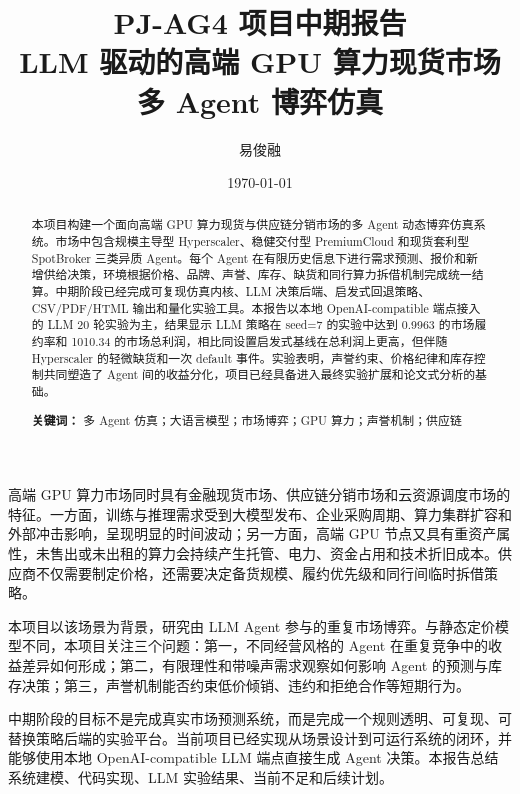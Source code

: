 \documentclass[11pt, a4paper]{article}
\title{\textbf{PJ-AG4 项目中期报告}\\[0.35em]
{\large LLM 驱动的高端 GPU 算力现货市场多 Agent 博弈仿真}}
\author{易俊融}
\date{\today}
\makeatletter
\renewcommand\section{\@startsection{section}{1}{\z@}{-1.2em \@plus -0.3em}{0.5em}{\normalfont\Large\bfseries}}
\makeatother
\begin{document}
\maketitle
\vspace{-1em}

\begin{abstract}
\noindent
本项目构建一个面向高端 GPU 算力现货与供应链分销市场的多 Agent 动态博弈仿真系统。市场中包含规模主导型 Hyperscaler、稳健交付型 PremiumCloud 和现货套利型 SpotBroker 三类异质 Agent。每个 Agent 在有限历史信息下进行需求预测、报价和新增供给决策，环境根据价格、品牌、声誉、库存、缺货和同行算力拆借机制完成统一结算。中期阶段已经完成可复现仿真内核、LLM 决策后端、启发式回退策略、CSV/PDF/HTML 输出和量化实验工具。本报告以本地 OpenAI-compatible 端点接入的 LLM 20 轮实验为主，结果显示 LLM 策略在 seed=7 的实验中达到 0.9963 的市场履约率和 1010.34 的市场总利润，相比同设置启发式基线在总利润上更高，但伴随 Hyperscaler 的轻微缺货和一次 default 事件。实验表明，声誉约束、价格纪律和库存控制共同塑造了 Agent 间的收益分化，项目已经具备进入最终实验扩展和论文式分析的基础。

\vspace{0.4em}
\noindent\textbf{关键词：} 多 Agent 仿真；大语言模型；市场博弈；GPU 算力；声誉机制；供应链
\end{abstract}

\section{引言}

高端 GPU 算力市场同时具有金融现货市场、供应链分销市场和云资源调度市场的特征。一方面，训练与推理需求受到大模型发布、企业采购周期、算力集群扩容和外部冲击影响，呈现明显的时间波动；另一方面，高端 GPU 节点又具有重资产属性，未售出或未出租的算力会持续产生托管、电力、资金占用和技术折旧成本。供应商不仅需要制定价格，还需要决定备货规模、履约优先级和同行间临时拆借策略。

本项目以该场景为背景，研究由 LLM Agent 参与的重复市场博弈。与静态定价模型不同，本项目关注三个问题：第一，不同经营风格的 Agent 在重复竞争中的收益差异如何形成；第二，有限理性和带噪声需求观察如何影响 Agent 的预测与库存决策；第三，声誉机制能否约束低价倾销、违约和拒绝合作等短期行为。

中期阶段的目标不是完成真实市场预测系统，而是完成一个规则透明、可复现、可替换策略后端的实验平台。当前项目已经实现从场景设计到可运行系统的闭环，并能够使用本地 OpenAI-compatible LLM 端点直接生成 Agent 决策。本报告总结系统建模、代码实现、LLM 实验结果、当前不足和后续计划。
\end{document}
